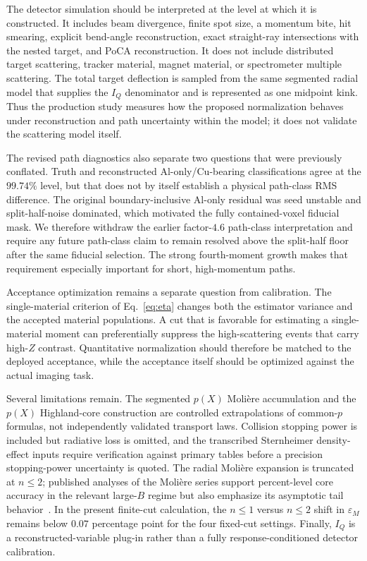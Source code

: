 \documentclass[aps,pra,reprint,longbibliography,floatfix]{revtex4-2}
\newcommand{\epsM}{\ensuremath{\varepsilon_M}}
\begin{document}
The detector simulation should be interpreted at the level at which it is constructed.  It includes beam divergence, finite spot size, a momentum bite, hit smearing, explicit bend-angle reconstruction, exact straight-ray intersections with the nested target, and PoCA reconstruction.  It does not include distributed target scattering, tracker material, magnet material, or spectrometer multiple scattering.  The total target deflection is sampled from the same segmented radial model that supplies the $I_Q$ denominator and is represented as one midpoint kink.  Thus the production study measures how the proposed normalization behaves under reconstruction and path uncertainty within the model; it does not validate the scattering model itself.

The revised path diagnostics also separate two questions that were previously conflated.  Truth and reconstructed Al-only/Cu-bearing classifications agree at the $99.74\%$ level, but that does not by itself establish a physical path-class RMS difference.  The original boundary-inclusive Al-only residual was seed unstable and split-half-noise dominated, which motivated the fully contained-voxel fiducial mask.  We therefore withdraw the earlier factor-$4.6$ path-class interpretation and require any future path-class claim to remain resolved above the split-half floor after the same fiducial selection.  The strong fourth-moment growth makes that requirement especially important for short, high-momentum paths.

Acceptance optimization remains a separate question from calibration.  The single-material criterion of Eq.~\eqref{eq:eta} changes both the estimator variance and the accepted material populations.  A cut that is favorable for estimating a single-material moment can preferentially suppress the high-scattering events that carry high-$Z$ contrast.  Quantitative normalization should therefore be matched to the deployed acceptance, while the acceptance itself should be optimized against the actual imaging task.

Several limitations remain.  The segmented $p(X)$ Moli\`ere accumulation and the $p(X)$ Highland-core construction are controlled extrapolations of common-$p$ formulas, not independently validated transport laws.  Collision stopping power is included but radiative loss is omitted, and the transcribed Sternheimer density-effect inputs require verification against primary tables before a precision stopping-power uncertainty is quoted.  The radial Moli\`ere expansion is truncated at $n\le2$; published analyses of the Moli\`ere series support percent-level core accuracy in the relevant large-$B$ regime but also emphasize its asymptotic tail behavior~\cite{andreo1993,bondarenco2016}.  In the present finite-cut calculation, the $n\le1$ versus $n\le2$ shift in $\epsM$ remains below $0.07$ percentage point for the four fixed-cut settings.  Finally, $I_Q$ is a reconstructed-variable plug-in rather than a fully response-conditioned detector calibration.
\end{document}
